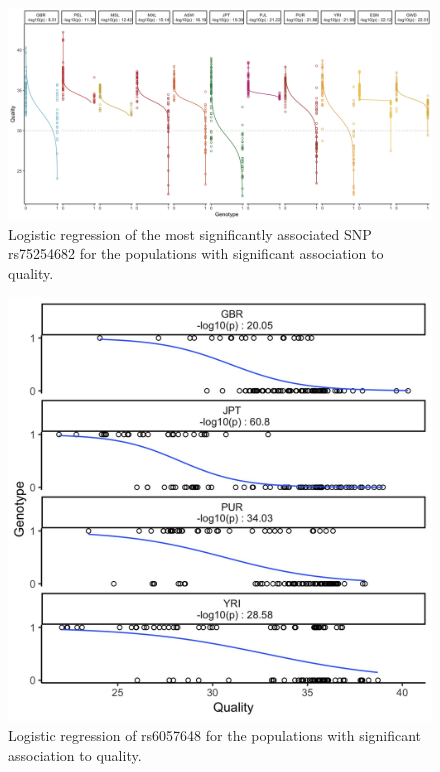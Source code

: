 \documentclass[9pt,lineno]{elife}
\begin{document}
\begin{figure}
\includegraphics[width=\hsize,keepaspectratio]{RegressionPlot_mostSig2.jpg}
\caption{Logistic regression of the most significantly associated SNP rs75254682 for the populations with significant association to quality.}
\label{MostSig}
\end{figure}

\begin{figure}
\includegraphics[width=\hsize,keepaspectratio]{RegressionPlot.jpg}
\caption{Logistic regression of rs6057648 for the populations with significant association to quality.}
\label{TwinsSNP}
\end{figure}



\end{document}
